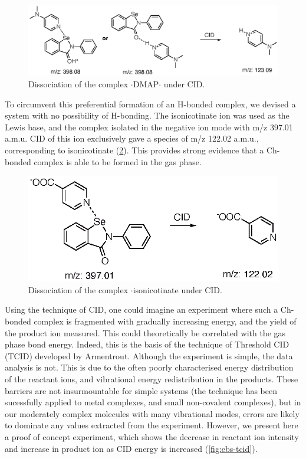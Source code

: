 \begin{figure}
    \centering
    \includegraphics[scale=0.8]{Figures/pos-esi-ms.eps}
    \caption[Positive mode ESI of $\cdot$DMAP$\cdot$]{Dissociation of the complex $\cdot$DMAP$\cdot$ under CID.}
    \label{fig:pos-esi-ms}
\end{figure}

To circumvent this preferential formation of an H-bonded complex, we devised a system with no possibility of H-bonding.
The isonicotinate ion was used as the Lewis base, and the complex isolated in the negative ion mode with m/z 397.01 a.m.u.
CID of this ion exclusively gave a species of m/z 122.02 a.m.u., corresponding to isonicotinate (\ref{fig:neg-esi-ms}).
This provides strong evidence that a Ch-bonded complex is able to be formed in the gas phase.

\begin{figure}
    \centering
    \includegraphics[scale=0.8]{Figures/neg-esi-ms.eps}
    \caption[Negative mode ESI of $\cdot$isonicotinate]{Dissociation of the complex $\cdot$isonicotinate under CID.}
    \label{fig:neg-esi-ms}
\end{figure}

Using the technique of CID, one could imagine an experiment where such a Ch-bonded complex is fragmented with gradually increasing energy, and the yield of the product ion measured.
This could theoretically be correlated with the gas phase bond energy.
Indeed, this is the basis of the technique of Threshold CID (TCID) developed by Armentrout.\autocite{Armentrout2003,Rodgers2000,Narancic2007}
Although the experiment is simple, the data analysis is not.
This is due to the often poorly characterised energy distribution of the reactant ions, and vibrational energy redistribution in the products.
These barriers are not insurmountable for simple systems (the technique has been sucessfully applied to metal complexes, and small non-covalent complexes), but in our moderately complex molecules with many vibrational modes, errors are likely to dominate any values extracted from the experiment.
However, we present here a proof of concept experiment, which shows the decrease in reactant ion intensity and increase in product ion as CID energy is increased (\ref{fig:ebs-tcid}).

